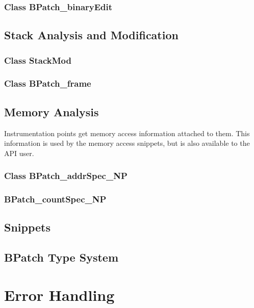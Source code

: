 \documentclass{article}
\begin{document}
    \subsubsection{Class BPatch\_binaryEdit}
        

  \subsection{Stack Analysis and Modification}

    \subsubsection{Class StackMod}
      
    \subsubsection{Class BPatch\_frame}
      

  \subsection{Memory Analysis}
    Instrumentation points get memory access information attached to them.
    This information is used by the memory access snippets, but is also
    available to the API user.

    \subsubsection{Class BPatch\_addrSpec\_NP}
      
    \subsubsection{BPatch\_countSpec\_NP}
      

  \subsection{Snippets}
    

  \subsection{BPatch Type System}
  \label{sec:typesystem}
    

\section{Error Handling}
  
\end{document}
